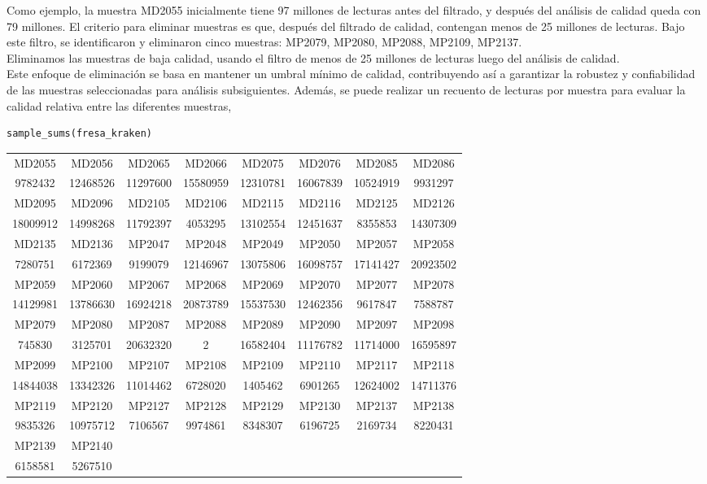 Como ejemplo, la muestra MD2055 inicialmente tiene 97 millones de lecturas antes del filtrado, y después del análisis de calidad queda con 79 millones. El criterio para eliminar muestras es que, después del filtrado de calidad, contengan menos de 25 millones de lecturas. Bajo este filtro, se identificaron y eliminaron cinco muestras: MP2079, MP2080, MP2088, MP2109, MP2137.\\

Eliminamos las muestras de baja calidad, usando el filtro de menos de 25 millones de lecturas luego del análisis de calidad.\\

Este enfoque de eliminación se basa en mantener un umbral mínimo de calidad, contribuyendo así a garantizar la robustez y confiabilidad de las muestras seleccionadas para análisis subsiguientes. Además, se puede realizar un recuento de lecturas por muestra para evaluar la calidad relativa entre las diferentes muestras,\\

\begin{lstlisting}[basicstyle=\small] 
sample_sums(fresa_kraken)
\end{lstlisting}
\resizebox{0.9\textwidth}{!} {
\begin{tabular}{ c c c c c c c c }
MD2055 & MD2056 & MD2065 & MD2066 & MD2075 & MD2076 & MD2085 & MD2086 \\
9782432 & 12468526 & 11297600 & 15580959 & 12310781 & 16067839 & 10524919 & 9931297 \\
MD2095 & MD2096 & MD2105 & MD2106 & MD2115 & MD2116 & MD2125 & MD2126 \\
18009912 & 14998268 & 11792397 & 4053295 & 13102554 & 12451637 & 8355853 & 14307309 \\
MD2135 & MD2136 & MP2047 & MP2048 & MP2049 & MP2050 & MP2057 & MP2058 \\
7280751 & 6172369 & 9199079 & 12146967 & 13075806 & 16098757 & 17141427 & 20923502 \\
MP2059 & MP2060 & MP2067 & MP2068 & MP2069 & MP2070 & MP2077 & MP2078 \\
14129981 & 13786630 & 16924218 & 20873789 & 15537530 & 12462356 & 9617847 & 7588787 \\
MP2079 & MP2080 & MP2087 & MP2088 & MP2089 & MP2090 & MP2097 & MP2098 \\
745830 & 3125701 & 20632320 & 2 & 16582404 & 11176782 & 11714000 & 16595897 \\
MP2099 & MP2100 & MP2107 & MP2108 & MP2109 & MP2110 & MP2117 & MP2118 \\
14844038 & 13342326 & 11014462 & 6728020 & 1405462 & 6901265 & 12624002 & 14711376 \\
MP2119 & MP2120 & MP2127 & MP2128 & MP2129 & MP2130 & MP2137 & MP2138 \\
9835326 & 10975712 & 7106567 & 9974861 & 8348307 & 6196725 & 2169734 & 8220431 \\
MP2139 & MP2140 \\
6158581 & 5267510
\end{tabular}
}

